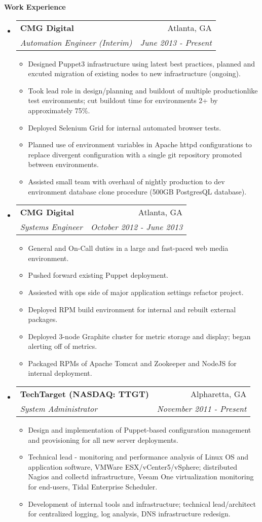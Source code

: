 \documentclass[letterpaper,11pt]{article}
\makeatletter
\newcommand{\resitem}[1]{\item #1 \vspace{-2pt}}
\newcommand{\resheading}[1]{{\large \colorbox{mygrey}{\begin{minipage}{\textwidth}{\textbf{#1 \vphantom{p\^{E}}}}\end{minipage}}}}
\newcommand{\ressubheading}[4]{
\begin{tabular*}{7.0in}{l@{\extracolsep{\fill}}r}
		\textbf{#1} & #2 \\
		\textit{#3} & \textit{#4} \\
\end{tabular*}\vspace{-6pt}}
\makeatother
\begin{document}
\resheading{Work Experience}
\begin{itemize}
\item
	\ressubheading{CMG Digital}{Atlanta, GA}{Automation Engineer (Interim)}{June 2013 - Present}
	\begin{itemize}
                \resitem{Designed Puppet3 infrastructure using latest best practices, planned and excuted migration of existing nodes to new infrastructure (ongoing).}
                \resitem{Took lead role in design/planning and buildout of multiple production\-like test environments; cut buildout time for environments 2+ by approximately 75\%.}
                \resitem{Deployed Selenium Grid for internal automated browser tests.}
                \resitem{Planned use of environment variables in Apache httpd configurations to replace divergent configuration with a single git repository promoted between environments.}
                \resitem{Assisted small team with overhaul of nightly production to dev environment database clone procedure (500GB PostgresQL database).}
	\end{itemize}

\item
	\ressubheading{CMG Digital}{Atlanta, GA}{Systems Engineer}{October 2012 - June 2013}
	\begin{itemize}
                \resitem{General and On-Call duties in a large and fast-paced web media environment.}
                \resitem{Pushed forward existing Puppet deployment.}
                \resitem{Assiested with ops side of major application settings refactor project.}
                \resitem{Deployed RPM build environment for internal and rebuilt external packages.}
                \resitem{Deployed 3-node Graphite cluster for metric storage and display; began alerting off of metrics.}
                \resitem{Packaged RPMs of Apache Tomcat and Zookeeper and NodeJS for internal deployment.}
	\end{itemize}

\item
	\ressubheading{TechTarget  (NASDAQ: TTGT)}{Alpharetta, GA}{System Administrator}{November 2011 - Present}
	\begin{itemize}
		\resitem{Design and implementation of Puppet-based configuration management and provisioning for all new server deployments.}
                \resitem{Technical lead - monitoring and performance analysis of Linux OS and application software, VMWare ESX/vCenter5/vSphere; distributed Nagios and collectd infrastructure, Veeam One virtualization monitoring for end-users, Tidal Enterprise Scheduler.}
                \resitem{Development of internal tools and infrastructure; technical lead/architect for centralized logging, log analysis, DNS infrastructure redesign.}
	\end{itemize}


\end{itemize}
\end{document}
